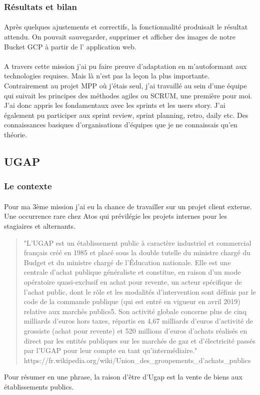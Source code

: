 \documentclass[12pt]{article}
\begin{document}
\begin {sloppypar}
\subsubsection{Résultats et bilan}
\paragraph{}
Après quelques ajustements et correctifs, la fonctionnalité produisait le résultat attendu. On 
pouvait sauvegarder, supprimer et afficher des images de notre Bucket GCP à partir de l'
application web. 
\paragraph{}
A travers cette mission j'ai pu faire preuve d'adaptation en m'autoformant aux technologies 
requises. Mais là n'est pas la leçon la plus importante. Contrairement au projet MPP où j'étais 
seul, j'ai travaillé au sein d'une équipe qui suivait les principes des méthodes agiles ou SCRUM,
une première pour moi. J'ai donc appris les fondamentaux avec les sprints et les users story. 
J'ai également pu participer aux sprint review, sprint planning, retro, daily etc. Des connaissances 
basiques d'organisations d'équipes que je ne connaissais qu'en théorie.

\newpage
\subsection{UGAP}
\subsubsection{Le contexte}
\paragraph{}
Pour ma 3ème mission j'ai eu la chance de travailler sur un projet client externe. Une occurrence 
rare chez Atos qui prévilégie les projets internes pour les stagiaires et alternants.
\begin{quote}
  "L’UGAP est un établissement public à caractère industriel et commercial français créé en 
  1985 et placé sous la double tutelle du ministre chargé du Budget et du ministre chargé de 
  l'Éducation nationale. Elle est une centrale d'achat publique généraliste et constitue, 
  en raison d'un mode opératoire quasi-exclusif en achat pour revente, un acteur spécifique de 
  l’achat public, dont le rôle et les modalités d’intervention sont définis par le code de 
  la commande publique (qui est entré en vigueur en avril 2019) relative aux marchés publics5. 
  Son activité globale concerne plus de cinq milliards d'euros hors taxes, 
  répartis en 4,67 milliards d'euros d'activité de grossiste (achat pour revente) et 520 millions d'euros 
  d'achats réalisés en direct par les entités publiques sur les marchés de gaz et d'électricité passés par 
  l'UGAP pour leur compte en tant qu'intermédiaire." \linebreak 
  https://fr.wikipedia.org/wiki/Union\_des\_groupements\_d'achats\_publics 
\end{quote}
Pour résumer en une phrase, la raison d'être d'Ugap est la vente de biens aux établissements publics.

\end{sloppypar}
\end{document}
